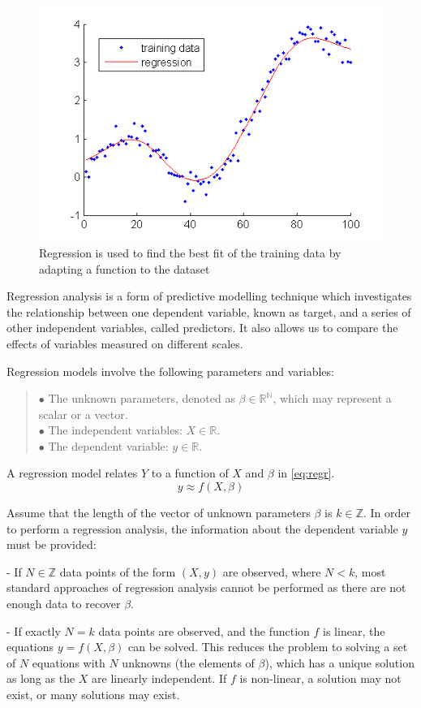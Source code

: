 \begin{figure}[h]
	\centering
	\includegraphics[height=0.42\linewidth]{./figures/regression}
	\caption{Regression is used to find the best fit of the training data by adapting a function to the dataset}
	\label{fig:regression}
\end{figure}

Regression analysis is a form of predictive modelling technique which investigates the relationship between one dependent variable, known as target, and a series of other independent variables, called predictors.  It also allows us to compare the effects of variables measured on different scales. \smallskip

\noindent Regression models involve the following parameters and variables:
\begin{verse}
	$\bullet$ The unknown parameters, denoted as $\beta\in\mathbb{R^\mathbb{N}}$, which may represent a scalar or a vector.\\
	$\bullet$ The independent variables: $X\in\mathbb{R}$.\\
	$\bullet$ The dependent variable: $y\in\mathbb{R}$.
\end{verse}

\noindent A regression model relates $Y$ to a function of $X$ and $\beta$ in \autoref{eq:regr}.
\begin{equation} y \approx f(X,\beta) \label{eq:regr} \end{equation}

Assume that the length of the vector of unknown parameters $\beta$ is $k\in \mathbb{Z}$. In order to perform a regression analysis, the information about the dependent variable $y$ must be provided:\smallskip

\noindent- If $N\in\mathbb{Z}$ data points of the form $(X,y)$ are observed, where $N<k$, most standard approaches of regression analysis cannot be performed as there are not enough data to recover $\beta$.\smallskip

\noindent- If exactly $N=k$ data points are observed, and the function $f$ is linear, the equations $y=f(X,\beta)$ can be solved. This reduces the problem to solving a set of $N$ equations with $N$ unknowns (the elements of $\beta$), which has a unique solution as long as the $X$ are linearly independent. If $f$ is non-linear, a solution may not exist, or many solutions may exist.\smallskip

